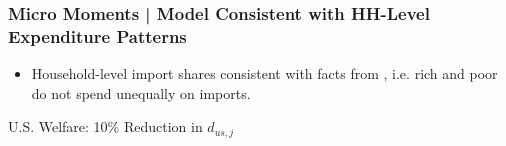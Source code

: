 \documentclass[9pt,pdftex,aspectratio=1610]{beamer}
\theoremstyle{definition}
\begin{document}
\begin{frame}[t]
\frametitle{Micro Moments | Model Consistent with HH-Level Expenditure Patterns}
\begin{figure}[!t]
\end{figure}
\begin{itemize}
\smallskip
\item Household-level import shares consistent with facts from  \citet{borusyak2021distributional}, i.e. rich and poor do not spend unequally on imports.
\end{itemize}
\end{frame}


\begin{frame}[t]{U.S. Welfare: 10\% Reduction in $d_{us,j}$}
\begin{figure}[!t]
\end{figure}
\end{frame}
\end{document}
